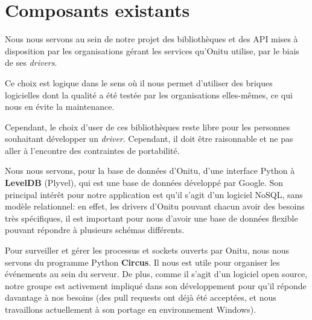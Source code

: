 \section{Composants existants}
\thispagestyle{EIP} %
Nous nous servons au sein de notre projet des bibliothèques et des API mises à disposition par les organisations gérant les services qu'Onitu utilise, par le biais de ses \textit{drivers}.

Ce choix est logique dans le sens où il nous permet d'utiliser des briques logicielles dont la qualité a été testée par les organisations elles-mêmes, ce qui nous en évite la maintenance.

Cependant, le choix d'user de ces bibliothèques reste libre pour les personnes souhaitant développer un \textit{driver}. Cependant, il doit être raisonnable et ne pas aller à l'encontre des contraintes de portabilité.

Nous nous servons, pour la base de données d'Onitu, d'une interface Python à \textbf{LevelDB} (Plyvel), qui est une base de données développé par Google. Son principal intérêt pour notre application est qu'il s'agit d'un logiciel NoSQL, sans modèle relationnel: en effet, les drivers d'Onitu pouvant chacun avoir des besoins très spécifiques, il est important pour nous d'avoir une base de données flexible pouvant répondre à plusieurs schémas différents.

Pour surveiller et gérer les processus et sockets ouverts par Onitu, nous nous servons du programme Python \textbf{Circus}. Il nous est utile pour organiser les événements au sein du serveur. De plus, comme il s'agit d'un logiciel open source, notre groupe est activement impliqué dans son développement pour qu'il réponde davantage à nos besoins (des pull requests ont déjà été acceptées, et nous travaillons actuellement à son portage en environnement Windows).